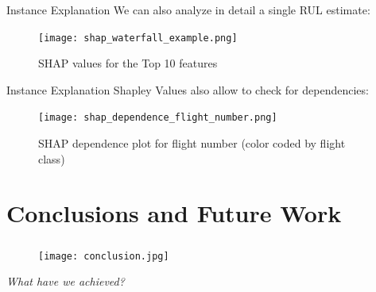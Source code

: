 \documentclass{beamer}
\begin{document}
        \begin{frame}{Instance Explanation}
            We can also analyze in detail a single RUL estimate:
            \begin{figure}
                \centering
                \texttt{[image: shap\_waterfall\_example.png]}
                \caption{SHAP values for the Top 10 features}
            \end{figure}
        \end{frame}

        \begin{frame}{Instance Explanation}
            Shapley Values also allow to check for dependencies:
            \begin{figure}
                \centering
                \texttt{[image: shap\_dependence\_flight\_number.png]}
                \caption{SHAP dependence plot for flight number (color coded by flight class)}
            \end{figure}
        \end{frame}

    \section{Conclusions and Future Work}

        {
            \begin{frame}
                \frametitle{\insertsection}
                \begin{figure}
                    \centering
                    \texttt{[image: conclusion.jpg]}
                \end{figure}
                \begin{center}
                    \textit{What have we achieved?}
                \end{center}
            \end{frame}
        }
\end{document}

